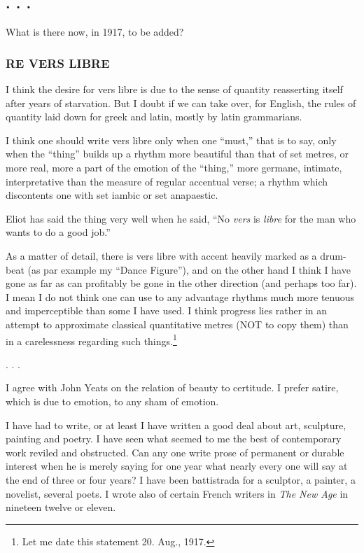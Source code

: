 \subsection{. . .}\label{section-2}

What is there now, in 1917, to be added?

\subsubsection{RE VERS LIBRE}\label{re-vers-libre}

I think the desire for vers libre is due to the sense of quantity
reasserting itself after years of starvation. But I doubt if we can take
over, for English, the rules of quantity laid down for greek and latin,
mostly by latin grammarians.

I think one should write vers libre only when one ``must,'' that is to
say, only when the ``thing'' builds up a rhythm more beautiful than that
of set metres, or more real, more a part of the emotion of the
``thing,'' more germane, intimate, interpretative than the measure of
regular accentual verse; a rhythm which discontents one with set iambic
or set anapaestic.

Eliot has said the thing very well when he said, ``No \emph{vers} is
\emph{libre} for the man who wants to do a good job.''

As a matter of detail, there is vers libre with accent heavily marked as
a drum-beat (as par example my ``Dance Figure''), and on the other hand
I think I have gone as far as can profitably be gone in the other
direction (and perhaps too far). I mean I do not think one can use to
any advantage rhythms much more tenuous and imperceptible than some I
have used. I think progress lies rather in an attempt to approximate
classical quantitative metres (NOT to copy them) than in a carelessness
regarding such things.\footnote{Let me date this statement 20. Aug.,
  1917.}

. . .

I agree with John Yeats on the relation of beauty to certitude. I prefer
satire, which is due to emotion, to any sham of emotion.

I have had to write, or at least I have written a good deal about art,
sculpture, painting and poetry. I have seen what seemed to me the best
of contemporary work reviled and obstructed. Can any one write prose of
permanent or durable interest when he is merely saying for one year what
nearly every one will say at the end of three or four years? I have been
battistrada for a sculptor, a painter, a novelist, several poets. I
wrote also of certain French writers in \emph{The New Age} in nineteen
twelve or eleven.

